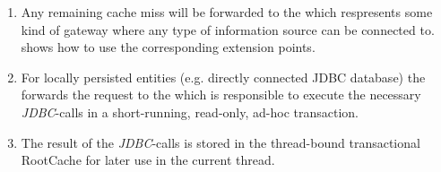 \begin{itemize}
\begin{enumerate}
			\item Any remaining cache miss will be forwarded to the  which respresents some kind of gateway where any type of information source can be connected to.  shows how to use the corresponding extension points.
			\item For locally persisted entities (e.g. directly connected JDBC database) the  forwards the request to the  which is responsible to execute the necessary \emph{JDBC}-calls in a short-running, read-only, ad-hoc transaction.
			\item The result of the \emph{JDBC}-calls is stored in the thread-bound transactional RootCache for later use in the current thread.
		\end{enumerate}
\end{itemize}
